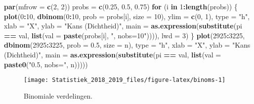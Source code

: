 \documentclass[12pt,dutch,coursenotes]{book}
\newenvironment{Shaded}{\begin{snugshade}}{\end{snugshade}}
\newcommand{\KeywordTok}[1]{\textcolor[rgb]{0.13,0.29,0.53}{\textbf{#1}}}
\newcommand{\DataTypeTok}[1]{\textcolor[rgb]{0.13,0.29,0.53}{#1}}
\newcommand{\DecValTok}[1]{\textcolor[rgb]{0.00,0.00,0.81}{#1}}
\newcommand{\FloatTok}[1]{\textcolor[rgb]{0.00,0.00,0.81}{#1}}
\newcommand{\StringTok}[1]{\textcolor[rgb]{0.31,0.60,0.02}{#1}}
\newcommand{\ControlFlowTok}[1]{\textcolor[rgb]{0.13,0.29,0.53}{\textbf{#1}}}
\newcommand{\OperatorTok}[1]{\textcolor[rgb]{0.81,0.36,0.00}{\textbf{#1}}}
\newcommand{\NormalTok}[1]{#1}
\theoremstyle{definition}
\theoremstyle{definition}
\theoremstyle{definition}
\theoremstyle{remark}
\begin{document}
\begin{Shaded}
\begin{Highlighting}[]
\KeywordTok{par}\NormalTok{(}\DataTypeTok{mfrow =} \KeywordTok{c}\NormalTok{(}\DecValTok{2}\NormalTok{, }\DecValTok{2}\NormalTok{))}
\NormalTok{probs =}\StringTok{ }\KeywordTok{c}\NormalTok{(}\FloatTok{0.25}\NormalTok{, }\FloatTok{0.5}\NormalTok{, }\FloatTok{0.75}\NormalTok{)}
\ControlFlowTok{for}\NormalTok{ (i }\ControlFlowTok{in} \DecValTok{1}\OperatorTok{:}\KeywordTok{length}\NormalTok{(probs)) \{}
    \KeywordTok{plot}\NormalTok{(}\DecValTok{0}\OperatorTok{:}\DecValTok{10}\NormalTok{, }\KeywordTok{dbinom}\NormalTok{(}\DecValTok{0}\OperatorTok{:}\DecValTok{10}\NormalTok{, }\DataTypeTok{prob =}\NormalTok{ probs[i], }\DataTypeTok{size =} \DecValTok{10}\NormalTok{), }
        \DataTypeTok{ylim =} \KeywordTok{c}\NormalTok{(}\DecValTok{0}\NormalTok{, }\DecValTok{1}\NormalTok{), }\DataTypeTok{type =} \StringTok{"h"}\NormalTok{, }\DataTypeTok{xlab =} \StringTok{"X"}\NormalTok{, }\DataTypeTok{ylab =} \StringTok{"Kans (Dichtheid)"}\NormalTok{, }
        \DataTypeTok{main =} \KeywordTok{as.expression}\NormalTok{(}\KeywordTok{substitute}\NormalTok{(pi }\OperatorTok{==}\StringTok{ }\NormalTok{val, }
            \KeywordTok{list}\NormalTok{(}\DataTypeTok{val =} \KeywordTok{paste}\NormalTok{(probs[i], }\StringTok{", nobs=10"}\NormalTok{)))), }
        \DataTypeTok{lwd =} \DecValTok{3}\NormalTok{)}
\NormalTok{\}}
\KeywordTok{plot}\NormalTok{(}\DecValTok{2925}\OperatorTok{:}\DecValTok{3225}\NormalTok{, }\KeywordTok{dbinom}\NormalTok{(}\DecValTok{2925}\OperatorTok{:}\DecValTok{3225}\NormalTok{, }\DataTypeTok{prob =} \FloatTok{0.5}\NormalTok{, }\DataTypeTok{size =}\NormalTok{ n), }
    \DataTypeTok{type =} \StringTok{"h"}\NormalTok{, }\DataTypeTok{xlab =} \StringTok{"X"}\NormalTok{, }\DataTypeTok{ylab =} \StringTok{"Kans (Dichtheid)"}\NormalTok{, }
    \DataTypeTok{main =} \KeywordTok{as.expression}\NormalTok{(}\KeywordTok{substitute}\NormalTok{(pi }\OperatorTok{==}\StringTok{ }\NormalTok{val, }\KeywordTok{list}\NormalTok{(}\DataTypeTok{val =} \KeywordTok{paste0}\NormalTok{(}\StringTok{"0.5, nobs="}\NormalTok{, }
\NormalTok{        n)))))}
\end{Highlighting}
\end{Shaded}

\begin{figure}

{\centering \texttt{[image: Statistiek\_2018\_2019\_files/figure-latex/binoms-1]} 

}

\caption{Binomiale verdelingen.}\label{fig:binoms}
\end{figure}
\end{document}
